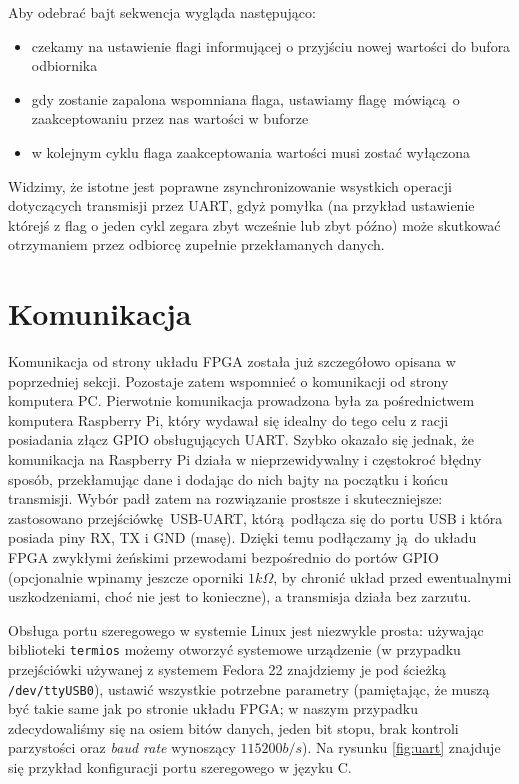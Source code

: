 Aby odebrać bajt sekwencja wygląda następująco:
\begin{itemize}
  \item czekamy na ustawienie flagi informującej o przyjściu nowej wartości do bufora odbiornika
  \item gdy zostanie zapalona wspomniana flaga, ustawiamy flagę mówiącą o zaakceptowaniu przez nas wartości w buforze
  \item w kolejnym cyklu flaga zaakceptowania wartości musi zostać wyłączona
\end{itemize}

Widzimy, że istotne jest poprawne zsynchronizowanie wsystkich operacji dotyczących transmisji przez UART, gdyż pomyłka (na przykład ustawienie którejś z flag o jeden cykl zegara zbyt wcześnie lub zbyt późno) może skutkować otrzymaniem przez odbiorcę zupełnie przekłamanych danych.

\section{Komunikacja}

Komunikacja od strony układu FPGA została już szczegółowo opisana w poprzedniej sekcji. Pozostaje zatem wspomnieć o komunikacji od strony komputera PC. Pierwotnie komunikacja prowadzona była za pośrednictwem komputera Raspberry Pi, który wydawał się idealny do tego celu z racji posiadania złącz GPIO obsługujących UART. Szybko okazało się jednak, że komunikacja na Raspberry Pi działa w nieprzewidywalny i częstokroć błędny sposób, przekłamując dane i dodając do nich bajty na początku i końcu transmisji. Wybór padł zatem na rozwiązanie prostsze i skuteczniejsze: zastosowano przejściówkę USB-UART, którą podłącza się do portu USB i która posiada piny RX, TX i GND (masę). Dzięki temu podłączamy ją do układu FPGA zwykłymi żeńskimi przewodami bezpośrednio do portów GPIO (opcjonalnie wpinamy jeszcze oporniki $1k\Omega $, by chronić układ przed ewentualnymi uszkodzeniami, choć nie jest to konieczne), a transmisja działa bez zarzutu.

Obsługa portu szeregowego w systemie Linux jest niezwykle prosta: używając biblioteki \texttt{termios} możemy otworzyć systemowe urządzenie (w przypadku przejściówki używanej z systemem Fedora 22 znajdziemy je pod ścieżką \texttt{/dev/ttyUSB0}), ustawić wszystkie potrzebne parametry (pamiętając, że muszą być takie same jak po stronie układu FPGA; w naszym przypadku zdecydowaliśmy się na osiem bitów danych, jeden bit stopu, brak kontroli parzystości oraz \textit{baud rate} wynoszący $115200 b/s$). Na rysunku \ref{fig:uart} znajduje się przykład konfiguracji portu szeregowego w języku C.

